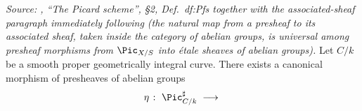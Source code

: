 \begin{theorem}
  \label{thm:rel_pic_etale_sheaf_unit_canonical}

  \textit{Source: \cite{kleiman-picard}, ``The Picard scheme'', \S 2,
  Def.~df:Pfs together with the associated-sheaf paragraph
  immediately following (the natural map from a presheaf to its
  associated sheaf, taken inside the category of abelian groups, is
  universal among presheaf morphisms from \(\Pic_{X/S}\) into \'etale
  sheaves of abelian groups).}
  Let \(C/k\) be a smooth proper geometrically integral curve. There
  exists a canonical morphism of presheaves of abelian groups
  \[
    \eta \;\colon\; \Pic^\sharp_{C/k} \;\longrightarrow\;
\]
\end{theorem}
